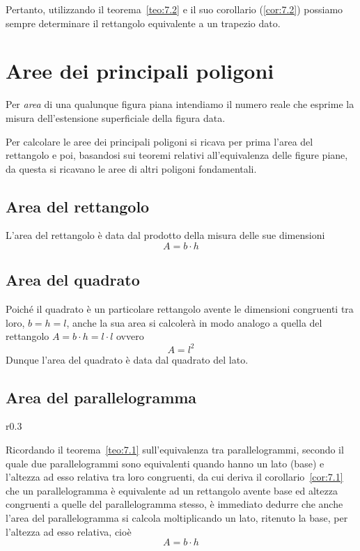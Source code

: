 Pertanto, utilizzando il teorema~\ref{teo:7.2} e il suo corollario 
(\ref{cor:7.2}) possiamo sempre determinare il rettangolo equivalente 
a un trapezio dato.


\section{Aree dei principali poligoni}
\label{sect:aree_poligoni}

Per \emph{area} di una qualunque figura piana intendiamo il numero 
reale che esprime la misura dell'estensione superficiale della figura 
data.

Per calcolare le aree dei principali poligoni si ricava per prima 
l'area del rettangolo e poi, basandosi sui teoremi relativi 
all'equivalenza delle figure piane, da questa si ricavano le aree di 
altri poligoni fondamentali.

\subsection{Area del rettangolo}

\begin{teorema}
L'area del rettangolo è data dal prodotto della misura delle sue 
dimensioni
\[\boxed{A=b\cdot h}\]
\end{teorema}

\begin{figure*}[!htb]
  \centering
\end{figure*}


\subsection{Area del quadrato}

Poiché il quadrato è un particolare rettangolo avente le dimensioni 
congruenti tra loro, \(b = h = l\), anche la sua area si calcolerà in 
modo analogo a quella del rettangolo \(A=b\cdot h=l\cdot l\) ovvero
\[\boxed{A=l^2}\]
Dunque l'area del quadrato è data dal quadrato del lato.

\subsection{Area del parallelogramma}

\begin{wrapfigure}{r}{0.3\textwidth}
  \centering
\end{wrapfigure}
Ricordando il teorema~\ref{teo:7.1} sull'equivalenza tra 
parallelogrammi, secondo il quale due parallelogrammi sono 
equivalenti quando hanno un lato (base) e l'altezza ad esso relativa 
tra loro congruenti, da cui deriva il corollario~\ref{cor:7.1} che un 
parallelogramma è equivalente ad un rettangolo avente base ed altezza 
congruenti a quelle del parallelogramma stesso, è immediato dedurre 
che anche l'area del parallelogramma si calcola moltiplicando un 
lato, ritenuto la base, per l'altezza ad esso relativa, cioè
\[\boxed{A=b\cdot h}\]

